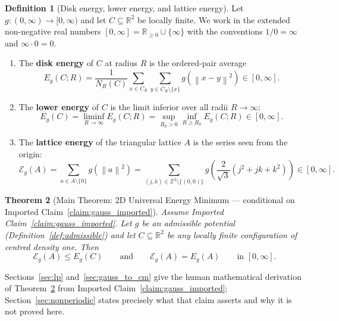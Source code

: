\documentclass[11pt, a4paper]{article}
\newtheorem{theorem}{Theorem}[section]
\theoremstyle{definition}
\newtheorem{definition}[theorem]{Definition}
\theoremstyle{remark}
\newcommand{\R}{\mathbb{R}}
\newcommand{\Z}{\mathbb{Z}}
\newcommand{\Ecal}{\mathcal{E}}
\newcommand{\norm}[1]{\left\lVert #1 \right\rVert}
\begin{document}
\begin{definition}[Disk energy, lower energy, and lattice energy]
\label{def:energies}
Let $g : (0, \infty) \to [0, \infty)$ and let $C \subseteq \R^2$ be locally finite. We work in the extended non-negative real numbers $[0, \infty] = \R_{\ge 0} \cup \{\infty\}$ with the conventions $1/0 = \infty$ and $\infty \cdot 0 = 0$.
\begin{enumerate}[label=(\roman*)]
    \item The \textbf{disk energy} of $C$ at radius $R$ is the ordered-pair average
    \begin{equation}
    \label{eq:disk_energy}
    E_g(C; R) = \frac{1}{N_R(C)} \sum_{x \in C_R} \sum_{y \in C_R \setminus \{x\}} g\left(\norm{x - y}^2\right) \in [0, \infty].
    \end{equation}
    \item The \textbf{lower energy} of $C$ is the limit inferior over all radii $R \to \infty$:
    \begin{equation}
    \label{eq:lower_energy}
    E_g(C) = \liminf_{R \to \infty} E_g(C; R) = \sup_{R_0 > 0} \inf_{R \ge R_0} E_g(C; R) \in [0, \infty].
    \end{equation}
    \item The \textbf{lattice energy} of the triangular lattice $A$ is the series seen from the origin:
    \begin{equation}
    \label{eq:lattice_energy}
    \Ecal_g(A) = \sum_{a \in A \setminus \{0\}} g\left(\norm{a}^2\right) = \sum_{(j, k) \in \Z^2 \setminus \{(0,0)\}} g\left(\frac{2}{\sqrt{3}}(j^2 + j k + k^2)\right) \in [0, \infty].
    \end{equation}
\end{enumerate}
\end{definition}

\begin{theorem}[Main Theorem: 2D Universal Energy Minimum --- conditional on Imported Claim~\ref{claim:gauss_imported}]
\label{thm:main}
Assume Imported Claim~\ref{claim:gauss_imported}. Let $g$ be an admissible potential (Definition~\ref{def:admissible}) and let $C \subseteq \R^2$ be any locally finite configuration of centred density one. Then
\[
\Ecal_g(A) \le E_g(C) \qquad \text{and} \qquad \Ecal_g(A) = E_g(A) \qquad \text{in } [0, \infty].
\]
\end{theorem}

\noindent Sections~\ref{sec:lp} and~\ref{sec:gauss_to_cm} give the human mathematical derivation of Theorem~\ref{thm:main} from Imported Claim~\ref{claim:gauss_imported}; Section~\ref{sec:nonperiodic} states precisely what that claim asserts and why it is not proved here.
\end{document}
